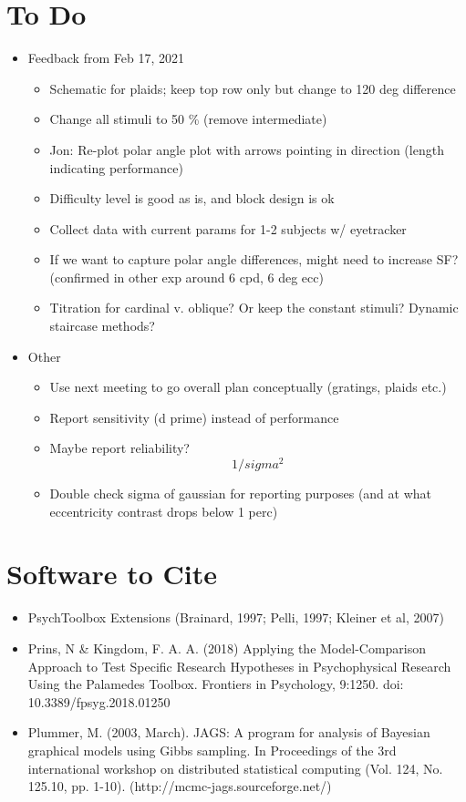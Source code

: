 \documentclass[11pt]{article} %
\begin{document}
\section{To Do} 
\begin{itemize}
\item Feedback from Feb 17, 2021
	\begin{itemize}
	\item Schematic for plaids; keep top row only but change to 120 deg difference
	\item Change all stimuli to 50 \% (remove intermediate)
	\item Jon: Re-plot polar angle plot with arrows pointing in direction (length indicating performance)
	\item Difficulty level is good as is, and block design is ok
	\item Collect data with current params for 1-2 subjects w/ eyetracker
	\item If we want to capture polar angle differences, might need to increase SF? (confirmed in other exp around 6 cpd, 6 deg ecc)
	\item Titration for cardinal v. oblique? Or keep the constant stimuli? Dynamic staircase methods?
	\end{itemize}
\item Other
	\begin{itemize}
	\item Use next meeting to go overall plan conceptually (gratings, plaids etc.)
	\item Report sensitivity (d prime) instead of performance
	\item Maybe report reliability? \begin{equation}1/sigma^{2}\end{equation}
	\item Double check sigma of gaussian for reporting purposes (and at what eccentricity contrast drops below 1 perc)
	\end{itemize}
\end{itemize}

\section{Software to Cite}
\begin{itemize}
\item PsychToolbox Extensions (Brainard, 1997; Pelli, 1997; Kleiner et al, 2007)
\item Prins, N \& Kingdom, F. A. A. (2018) Applying the Model-Comparison Approach to Test Specific Research Hypotheses in Psychophysical Research Using the Palamedes Toolbox. Frontiers in Psychology, 9:1250. doi: 10.3389/fpsyg.2018.01250
\item Plummer, M. (2003, March). JAGS: A program for analysis of Bayesian graphical models using Gibbs sampling. In Proceedings of the 3rd international workshop on distributed statistical computing (Vol. 124, No. 125.10, pp. 1-10). (http://mcmc-jags.sourceforge.net/)
\end{itemize}
\end{document}
